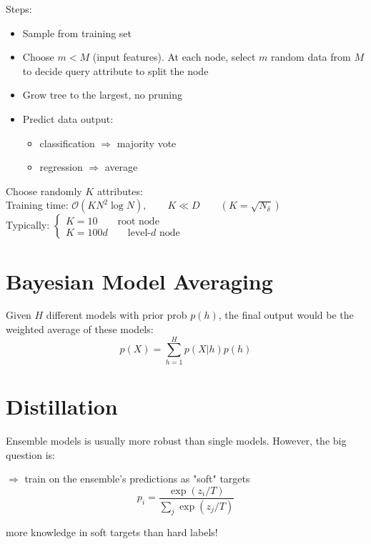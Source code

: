 Steps:
\begin{itemize}
	\item Sample from training set
	\item Choose $m<M$ (input features). At each node, select $m$ random data from $M$ to decide query attribute to split the node
	\item Grow tree to the largest, no pruning
	\item Predict data output:
	\begin{itemize}
		\item classification $\Rightarrow$ majority vote
		\item regression $\Rightarrow$ average
	\end{itemize}
\end{itemize}

Choose randomly $K$ attributes:\\
Training time: $\mathcal{O}(KN^2 \log N), \qquad K \ll D \qquad (K = \sqrt{N_\delta})$\\
Typically: $\begin{cases}
	K = 10 \qquad \text{root node}\\
	K=100 d \qquad \text{level-$d$ node}
\end{cases}$

\section{Bayesian Model Averaging}

Given $H$ different models with prior \ac{prob} $p(h)$, the final output would be the weighted average of these models:
\begin{equation}
	p(X) = \sum_{h=1}^{H} p(X|h)p(h)
\end{equation}

\section{Distillation}
\label{sec:distillation}
Ensemble models is usually more robust than single models. However, the big question is:\\

$\Rightarrow$  train on the ensemble's predictions as "soft" targets \cite{hinton2015distilling}
\begin{equation}
	p_i = \frac{\exp(z_i / T)}{\sum_j \exp (z_j / T)}
\end{equation}

 more knowledge in soft targets than hard labels!